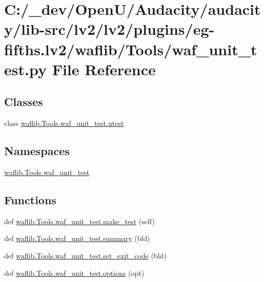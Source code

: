 \hypertarget{lv2_2plugins_2eg-fifths_8lv2_2waflib_2_tools_2waf__unit__test_8py}{}\section{C\+:/\+\_\+dev/\+Open\+U/\+Audacity/audacity/lib-\/src/lv2/lv2/plugins/eg-\/fifths.lv2/waflib/\+Tools/waf\+\_\+unit\+\_\+test.py File Reference}
\label{lv2_2plugins_2eg-fifths_8lv2_2waflib_2_tools_2waf__unit__test_8py}
\subsection*{Classes}
\begin{DoxyCompactItemize}
\item 
class \hyperlink{classwaflib_1_1_tools_1_1waf__unit__test_1_1utest}{waflib.\+Tools.\+waf\+\_\+unit\+\_\+test.\+utest}
\end{DoxyCompactItemize}
\subsection*{Namespaces}
\begin{DoxyCompactItemize}
\item 
 \hyperlink{namespacewaflib_1_1_tools_1_1waf__unit__test}{waflib.\+Tools.\+waf\+\_\+unit\+\_\+test}
\end{DoxyCompactItemize}
\subsection*{Functions}
\begin{DoxyCompactItemize}
\item 
def \hyperlink{namespacewaflib_1_1_tools_1_1waf__unit__test_a480792e43cdb6d6a2bd79b2ec412cf00}{waflib.\+Tools.\+waf\+\_\+unit\+\_\+test.\+make\+\_\+test} (self)
\item 
def \hyperlink{namespacewaflib_1_1_tools_1_1waf__unit__test_ad245dac5d636a5c5f49cb0e232d332f4}{waflib.\+Tools.\+waf\+\_\+unit\+\_\+test.\+summary} (bld)
\item 
def \hyperlink{namespacewaflib_1_1_tools_1_1waf__unit__test_a0f1dc47e6fcefddfd017ce557eb4da42}{waflib.\+Tools.\+waf\+\_\+unit\+\_\+test.\+set\+\_\+exit\+\_\+code} (bld)
\item 
def \hyperlink{namespacewaflib_1_1_tools_1_1waf__unit__test_a8f30080b41250ee5ad33b2ad2df40f0c}{waflib.\+Tools.\+waf\+\_\+unit\+\_\+test.\+options} (opt)
\end{DoxyCompactItemize}
